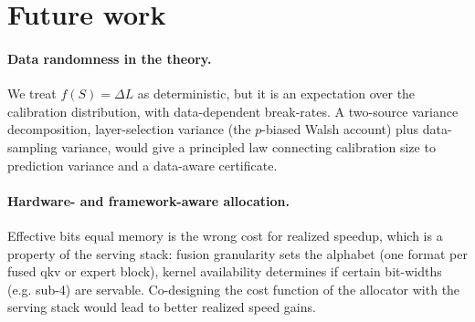 %

\section{Future work}\label{sec:future}

\paragraph{Data randomness in the theory.} We treat $f(S)=\Delta L$ as deterministic, but it is an
expectation over the calibration distribution, with data-dependent break-rates. A two-source variance
decomposition, layer-selection variance (the $p$-biased Walsh account) plus data-sampling variance, would
give a principled law connecting calibration size to prediction variance and a data-aware certificate.

\paragraph{Hardware- and framework-aware allocation.} Effective
bits equal memory is the wrong cost for realized speedup, which is a property of the serving stack: fusion
granularity sets the alphabet (one format per fused qkv or expert block), 
kernel availability determines if certain bit-widths (e.g. sub-4) are servable.
Co-designing the cost function of the allocator with the serving stack would lead to better realized speed gains.

